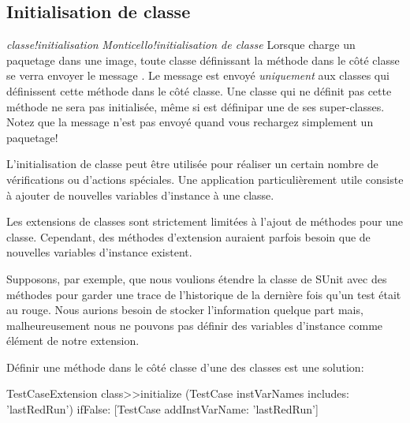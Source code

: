 \documentclass[a4paper,10pt,twoside]{book}
\begin{document}
\subsection{Initialisation de classe}

\emph{classe!initialisation}
\emph{Monticello!initialisation de classe}
Lorsque \MC charge un paquetage dans une image, toute classe
définissant la méthode   dans le côté classe se verra
envoyer le message  . 
Le message est envoyé \emph{uniquement} aux classes qui définissent
cette méthode dans le côté classe. Une classe qui ne définit
  pas cette méthode ne sera pas initialisée, même si  
  est définipar une de ses super-classes.
Notez que la message  n'est pas envoyé quand vous
rechargez simplement un paquetage!


L'initialisation de classe peut être utilisée pour réaliser un certain
nombre de vérifications ou d'actions spéciales. Une application
particulièrement utile consiste à ajouter de nouvelles variables
d'instance à une classe.

Les extensions de classes sont strictement limitées à l'ajout de
méthodes pour une classe. Cependant, des méthodes d'extension auraient
parfois besoin que de nouvelles variables d'instance existent.

Supposons, par exemple, que nous voulions étendre la classe 
 de  SUnit avec des méthodes pour garder une trace de
l'historique de la dernière fois qu'un test était au rouge. Nous
aurions besoin de stocker l'information quelque part mais,
malheureusement nous ne pouvons pas définir des variables d'instance
comme élément de notre extension.

Définir une méthode 
  dans le côté classe d'une des classes est une
 solution:

\begin{code}{}
TestCaseExtension class>>initialize
	(TestCase instVarNames includes: 'lastRedRun') 
		ifFalse: [TestCase addInstVarName: 'lastRedRun']
\end{code}

\end{document}
